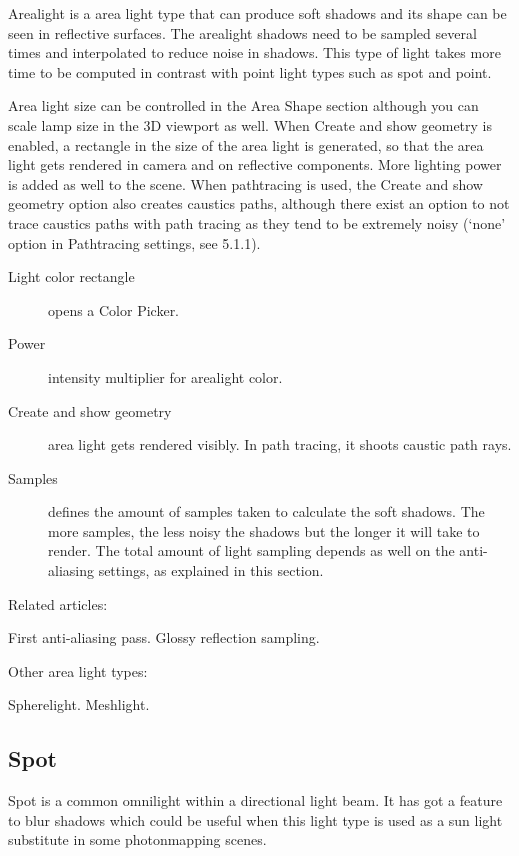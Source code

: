 Arealight is a area light type that can produce soft shadows and its shape can be seen in reflective surfaces. The arealight shadows need to be sampled several times and interpolated to reduce noise in shadows. This type of light takes more time to be computed in contrast with point light types such as spot and point.

Area light size can be controlled in the Area Shape section although you can scale lamp size in the 3D viewport as well. When Create and show geometry is enabled, a rectangle in the size of the area light is generated, so that the area light gets rendered in camera and on reflective components. More lighting power is added as well to the scene. When pathtracing is used, the Create and show geometry option also creates caustics paths, although there exist an option to not trace caustics paths with path tracing as they tend to be extremely noisy (`none' option in Pathtracing settings, see 5.1.1).

\begin{description}
\item[Light color rectangle] opens a Color Picker.
\item[Power] intensity multiplier for arealight color.
\item[Create and show geometry] area light gets rendered visibly. In path tracing, it shoots caustic path rays.
\item[Samples] defines the amount of samples taken to calculate the soft shadows. The more samples, the less noisy the shadows but the longer it will take to render. The total amount of light sampling depends as well on the anti-aliasing settings, as explained in this section.
\end{description}


Related articles:

First anti-aliasing pass.
Glossy reflection sampling.

Other area light types:

Spherelight.
Meshlight.

\subsection{Spot}

Spot is a common omnilight within a directional light beam. It has got a feature to blur shadows which could be useful when this light type is used as a sun light substitute in some photonmapping scenes.

